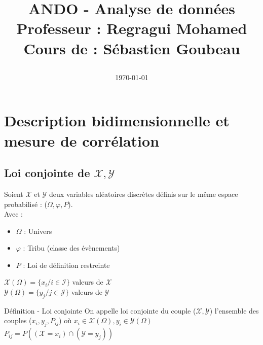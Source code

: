 \documentclass[a4paper, 12pt]{article}
\newcommand{\nomcours}{ANDO - Analyse de données}
\newcommand{\nomprofesseur}{Regragui Mohamed}
\newcommand{\nomauteur}{Sébastien Goubeau}
\begin{document}
\title{
\vspace{130pt}
\begin{centering}
\bigskip
\bigskip
\Huge {\textbf{\nomcours\\}}
\bigskip
\large{\textbf{Professeur} : \nomprofesseur \\ \textbf{Cours de} : \nomauteur}
\date{\today}
\end{centering}
}
\maketitle
\thispagestyle{empty}
\clearpage

\tableofcontents
\clearpage

\section{Description bidimensionnelle et mesure de corrélation}
\subsection{Loi conjointe de $\mathcal{X, Y}$}
Soient $\mathcal{X}$ et $\mathcal{Y}$ deux variables aléatoires discrètes définis sur le même espace probabilisé : ($\Omega{}, \varphi{}, P$).\\
Avec :
\begin{itemize}
\item $\Omega$ : Univers
\item $\varphi$ : Tribu (classe des évènements)
\item $P$ : Loi de définition restreinte
\end{itemize}

\begin{flushleft}
$\mathcal{X}(\Omega) = \{ x_i / i \in \mathcal{I} \}$ valeurs de $\mathcal{X}$\\
$\mathcal{Y}(\Omega) = \{ y_j / j \in \mathcal{J} \}$ valeurs de $\mathcal{Y}$
\end{flushleft}

\begin{definition}{Définition - Loi conjointe}
On appelle loi conjointe du couple ($\mathcal{X, Y}$) l'ensemble des couples ($x_i, y_j, P_{ij}$) où $x_i \in \mathcal{X}(\Omega), y_i \in \mathcal{Y}(\Omega)$\\
$P_{ij} = P ( (\mathcal{X} = x_i) \cap (\mathcal{Y} = y_j) )$
\end{definition}
\end{document}
